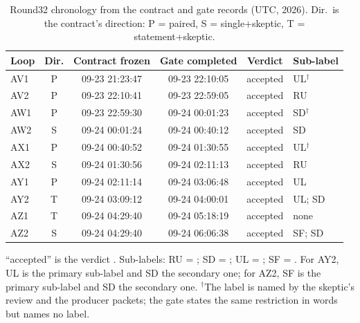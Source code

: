 \begin{table}[htbp]
\centering\small
\caption{Round32 chronology from the contract and gate records (UTC, 2026).
Dir.\ is the contract's direction: P = paired, S = single+skeptic,
T = statement+skeptic.}
\label{tab:history-chronology}
\begin{tabular}{@{}lccccl@{}}
\toprule
Loop & Dir. & Contract frozen & Gate completed & Verdict & Sub-label\\
\midrule
AV1 & P & 09-23 21:23:47 & 09-23 22:10:05 & accepted & UL$^\dagger$\\
AV2 & P & 09-23 22:10:41 & 09-23 22:59:05 & accepted & RU\\
AW1 & P & 09-23 22:59:30 & 09-24 00:01:23 & accepted & SD$^\dagger$\\
AW2 & S & 09-24 00:01:24 & 09-24 00:40:12 & accepted & SD\\
AX1 & P & 09-24 00:40:52 & 09-24 01:30:55 & accepted & UL$^\dagger$\\
AX2 & S & 09-24 01:30:56 & 09-24 02:11:13 & accepted & RU\\
AY1 & P & 09-24 02:11:14 & 09-24 03:06:48 & accepted & UL\\
AY2 & T & 09-24 03:09:12 & 09-24 04:00:01 & accepted & UL; SD\\
AZ1 & T & 09-24 04:29:40 & 09-24 05:18:19 & accepted & none\\
AZ2 & S & 09-24 04:29:40 & 09-24 06:06:38 & accepted & SF; SD\\
\bottomrule
\end{tabular}

\smallskip
\begin{minipage}{0.94\linewidth}\footnotesize\raggedright
``accepted'' is the verdict . Sub-labels:
RU = ; SD = ;
UL = ;
SF = . For AY2, UL is the
primary sub-label and SD the secondary one; for AZ2, SF is the primary
sub-label and SD the secondary one. $^\dagger$The label is named by
the skeptic's review and the producer packets; the gate states the same
restriction in words but names no label.
\end{minipage}
\end{table}

